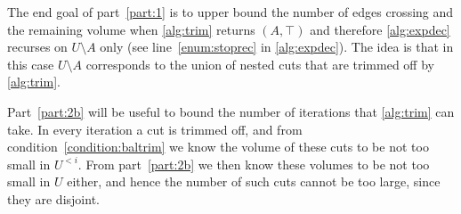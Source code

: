 \documentclass[epsfig,letter,11pt]{article}
\numberwithin{equation}{section}
\begin{document}
 \noindent
 The end goal of part~\eqref{part:1} is to upper bound the number of edges crossing and the remaining volume when \cref{alg:trim} returns $(A,\top)$ and therefore \cref{alg:expdec} recurses on $U \setminus A$ only (see line~\eqref{enum:stoprec} in \cref{alg:expdec}). The idea is that in this case $U \setminus A$ corresponds to the union of nested cuts that are trimmed off by \cref{alg:trim}.
 
 Part~\eqref{part:2b} will be useful to bound the number of iterations that \cref{alg:trim} can take. In every iteration a cut is trimmed off, and from condition~\eqref{condition:baltrim} we know the volume of these cuts to be not too small in $U^{<i}$. From part~\eqref{part:2b} we then know these volumes to be not too small in $U$ either, and hence the number of such cuts cannot be too large, since they are disjoint.
 
\end{document}
